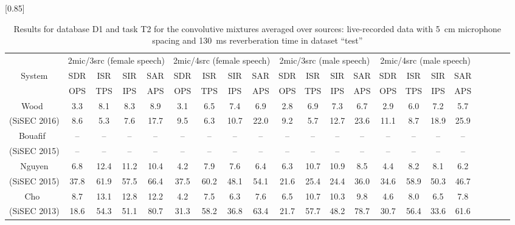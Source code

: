 \documentclass{article}
\begin{document}
\begin{table*}[t]
	\caption{Results for database D1 and task T2 for the convolutive mixtures averaged over sources: 
live-recorded data with 5~cm microphone spacing and 130~ms reverberation time in dataset ``test''}
	\vspace{-5pt}
	\begin{center}
	\scalebox{0.85}[0.85]{ %
		\begin{tabular}{|c|cccc|cccc|cccc|cccc|cccc|} \hline
			\multicolumn{1}{|c|}{}					& \multicolumn{4}{c|}{2mic/3src (female speech)}	& \multicolumn{4}{c|}{2mic/4src (female speech)}	& \multicolumn{4}{c|}{2mic/3src (male speech)} & \multicolumn{4}{c|}{2mic/4src (male speech)}\\
			\multicolumn{1}{|c|}{System}				&	SDR	&	ISR	& SIR	&	SAR			&	SDR	&	ISR &	SIR	&	SAR			&	SDR	&	ISR	&	SIR	&	SAR		&	SDR	&	ISR	&	SIR	&	SAR	\\
			\multicolumn{1}{|c|}{}					&	OPS	&	TPS	&	IPS	&	APS			&	OPS	&	TPS	&	IPS	&	APS			&	OPS	&	TPS	&	IPS	&	APS		&	OPS	&	TPS	&	IPS	&	APS	\\ \hline \hline
			\multirow{1}{*}{Wood~\cite{Wood}}		&	3.3	&	8.1	&	8.3	&	8.9			&	3.1	&	6.5	&	7.4	&	6.9			&	2.8	&	6.9	&	7.3	&	6.7		&	2.9	&	6.0	&	7.2	&	5.7	\\
			\multirow{1}{*}{(SiSEC 2016)}			&	8.6	&	5.3	&	7.6	&	17.7			&	9.5	&	6.3	&	10.7	&	22.0			&	9.2	&	5.7	&	12.7	&	23.6		&	11.1	&	8.7	&	18.9	&	25.9	\\ \hline
			\multirow{1}{*}{Bouafif~\cite{Bouafif}}		&	--	&	--	&	--	&	--			&	--	&	--	&	--	&	--			&	--	&	--	&	--	&	--		&	--	&	--	&	--	&	--	\\
			\multirow{1}{*}{(SiSEC 2015)}			&	--	&	--	&	--	&	--			&	--	&	--	&	--	&	--			&	--	&	--	&	--	&	--		&	--	&	--	&	--	&	--	\\ \hline
			\multirow{1}{*}{Nguyen}					&	6.8	&	12.4	&	11.2	&	10.4			&	4.2	&	7.9	&	7.6	&	6.4			&	6.3	&	10.7	&	10.9	&	8.5		&	4.4	&	8.2	&	8.1	&	6.2	\\
			\multirow{1}{*}{(SiSEC 2015)}			&	37.8	&	61.9	&	57.5	&	66.4			&	37.5	&	60.2	&	48.1	&	54.1			&	21.6	&	25.4	&	24.4	&	36.0		&	34.6	&	58.9	&	50.3	&	46.7	\\ \hline
			\multirow{1}{*}{Cho~\cite{Cho1}}			&	8.7	&	13.1	&	12.8	&	12.2			&	4.2	&	7.5	&	6.3	&	7.6			&	6.5	&	10.7	&	10.3	&	9.8		&	4.6	&	8.0	&	6.5	&	7.8	\\
			\multirow{1}{*}{(SiSEC 2013)}			&	18.6	&	54.3	&	51.1	&	80.7			&	31.3	&	58.2	&	36.8	&	63.4			&	21.7	&	57.7	&	48.2	&	78.7		&	30.7	&	56.4	&	33.6	&	61.6	\\ \hline

\end{tabular}}
\end{center}
\end{table*}
\end{document}
